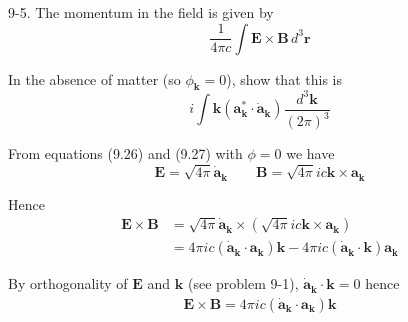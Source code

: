 \documentclass[12pt]{article}
\begin{document}
9-5.
The momentum in the field is given by
\begin{equation*}
\frac{1}{4\pi c}\int
\mathbf E\times\mathbf B\,d^3\mathbf r
\end{equation*}

In the absence of matter (so $\phi_{\mathbf k}=0$),
show that this is
\begin{equation*}
i\int\mathbf k\left(\mathbf a_{\mathbf k}^*\cdot\dot{\mathbf a}_{\mathbf k}\right)
\frac{d^3\mathbf k}{(2\pi)^3}
\end{equation*}

From equations (9.26) and (9.27) with $\phi=0$ we have
\begin{equation*}
\mathbf E=\sqrt{4\pi}\dot{\mathbf a}_{\mathbf k}
\qquad
\mathbf B=\sqrt{4\pi}ic\mathbf k\times\mathbf a_{\mathbf k}
\end{equation*}

Hence
\begin{align*}
\mathbf E\times\mathbf B&=\sqrt{4\pi}\dot{\mathbf a}_{\mathbf k}
\times\left(\sqrt{4\pi}ic\mathbf k\times\mathbf a_{\mathbf k}\right)
\\
&=4\pi ic(\dot{\mathbf a}_{\mathbf k}\cdot\mathbf a_{\mathbf k})\mathbf k
-4\pi ic(\dot{\mathbf a}_{\mathbf k}\cdot\mathbf k)\mathbf a_{\mathbf k}
\end{align*}

By orthogonality of $\mathbf E$ and $\mathbf k$ (see problem 9-1),
$\dot{\mathbf a}_{\mathbf k}\cdot\mathbf k=0$ hence
\begin{align*}
\mathbf E\times\mathbf B=4\pi ic(\dot{\mathbf a}_{\mathbf k}\cdot\mathbf a_{\mathbf k})\mathbf k
\end{align*}
\end{document}
